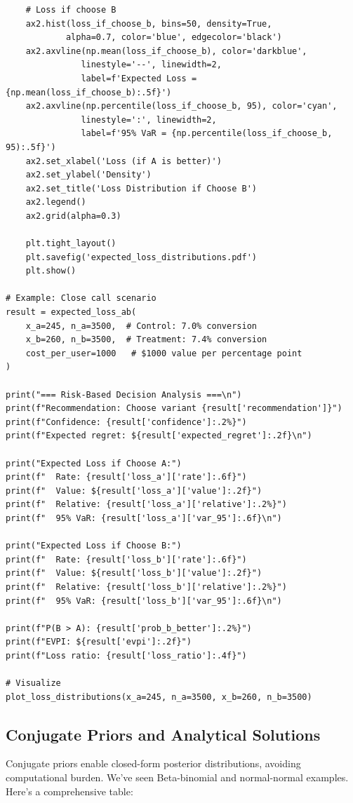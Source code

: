 \begin{lstlisting}
    # Loss if choose B
    ax2.hist(loss_if_choose_b, bins=50, density=True,
            alpha=0.7, color='blue', edgecolor='black')
    ax2.axvline(np.mean(loss_if_choose_b), color='darkblue',
               linestyle='--', linewidth=2,
               label=f'Expected Loss = {np.mean(loss_if_choose_b):.5f}')
    ax2.axvline(np.percentile(loss_if_choose_b, 95), color='cyan',
               linestyle=':', linewidth=2,
               label=f'95% VaR = {np.percentile(loss_if_choose_b, 95):.5f}')
    ax2.set_xlabel('Loss (if A is better)')
    ax2.set_ylabel('Density')
    ax2.set_title('Loss Distribution if Choose B')
    ax2.legend()
    ax2.grid(alpha=0.3)

    plt.tight_layout()
    plt.savefig('expected_loss_distributions.pdf')
    plt.show()

# Example: Close call scenario
result = expected_loss_ab(
    x_a=245, n_a=3500,  # Control: 7.0% conversion
    x_b=260, n_b=3500,  # Treatment: 7.4% conversion
    cost_per_user=1000   # $1000 value per percentage point
)

print("=== Risk-Based Decision Analysis ===\n")
print(f"Recommendation: Choose variant {result['recommendation']}")
print(f"Confidence: {result['confidence']:.2%}")
print(f"Expected regret: ${result['expected_regret']:.2f}\n")

print("Expected Loss if Choose A:")
print(f"  Rate: {result['loss_a']['rate']:.6f}")
print(f"  Value: ${result['loss_a']['value']:.2f}")
print(f"  Relative: {result['loss_a']['relative']:.2%}")
print(f"  95% VaR: {result['loss_a']['var_95']:.6f}\n")

print("Expected Loss if Choose B:")
print(f"  Rate: {result['loss_b']['rate']:.6f}")
print(f"  Value: ${result['loss_b']['value']:.2f}")
print(f"  Relative: {result['loss_b']['relative']:.2%}")
print(f"  95% VaR: {result['loss_b']['var_95']:.6f}\n")

print(f"P(B > A): {result['prob_b_better']:.2%}")
print(f"EVPI: ${result['evpi']:.2f}")
print(f"Loss ratio: {result['loss_ratio']:.4f}")

# Visualize
plot_loss_distributions(x_a=245, n_a=3500, x_b=260, n_b=3500)
\end{lstlisting}

\subsection{Conjugate Priors and Analytical Solutions}

Conjugate priors enable closed-form posterior distributions, avoiding computational burden. We've seen Beta-binomial and normal-normal examples. Here's a comprehensive table:

